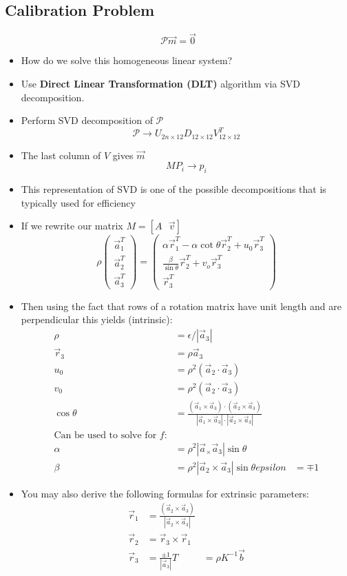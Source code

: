 \subsection{Calibration Problem}
$$\mathcal{P}\vec{m}=\vec{0}$$
\begin{itemize}
	\item How do we solve this homogeneous linear system?
	\item Use \textbf{Direct Linear Transformation (DLT)} algorithm via SVD decomposition.
	\item Perform SVD decomposition of $\mathcal{P}$
	$$\mathcal{P}\to U_{2n\times 12} D_{12\times 12} V_{12\times 12}^T$$
	\item The last column of $V$ gives $\vec{m}$
	$$M P_i\to p_i$$ 
	\item This representation of SVD is one of the possible decompositions that is typically used for efficiency
	\item If we rewrite our matrix $M=[A\text{ }\vec{v}]$
	$$\rho \begin{pmatrix}
		\vec{a}_1^T \\ \vec{a}_2^T \\ \vec{a}_3^T
	\end{pmatrix} = \begin{pmatrix}
		\alpha\vec{r}_1^T-\alpha\cot\theta\vec{r}_2^T+u_0\vec{r}_3^T\\
		\frac{\beta}{\sin\theta}\vec{r}^T_2 + v_o\vec{r}_3^T\\
		\vec{r}_3^T
	\end{pmatrix}$$
	\item Then using the fact that rows of a rotation matrix have unit length and are perpendicular this yields (intrinsic):
	$$\begin{aligned}
	\rho&=\epsilon/|\vec{a}_3|\\
	\vec{r}_3&=\rho\vec{a}_3\\
	u_0&=\rho^2(\vec{a}_2\cdot\vec{a}_3)\\
	v_0&=\rho^2(\vec{a}_2\cdot\vec{a}_3)\\
	\cos\theta &= \frac{(\vec{a}_1\times \vec{a}_3)\cdot(\vec{a}_2\times\vec{a}_3)}{|\vec{a}_1\times \vec{a}_3|\cdot|\vec{a}_2\times\vec{a}_3|}\\
	\text{Can be used to solve for $f$:} \\
	\alpha &=\rho^2 |\vec{a}_\times\vec{a}_3|\sin\theta \\
	\beta &=\rho^2 |\vec{a}_2\times\vec{a}_3|\sin\theta
	epsilon&=\mp 1\end{aligned}$$
	\item You may also derive the following formulas for extrinsic parameters:
	$$\begin{aligned}
		\vec{r}_1 &= \frac{(\vec{a}_2\times\vec{a}_3)}{|\vec{a}_2\times\vec{a}_3|}\\
		\vec{r}_2 &= \vec{r}_3\times\vec{r}_1 \\
		\vec{r}_3 &= \frac{\pm 1}{|\vec{a}_3|}
		T &= \rho K^{-1}\vec{b}
	\end{aligned}$$
\end{itemize}


